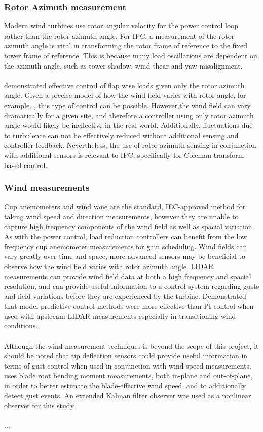 \subsubsection{Rotor Azimuth measurement}
Modern wind turbines use rotor angular velocity for the power control loop rather than the rotor azimuth angle. For IPC, a measurement of the rotor azimuth angle is vital in transforming the rotor frame of reference to the fixed tower frame of reference. This is because many load oscillations are dependent on the azimuth angle, such as tower shadow, wind shear and yaw misalignment. 
\\~\\
\citet{4_trudnowski} demonstrated effective control of flap wise loads given only the rotor azimuth angle. Given a precise model of how the wind field varies with rotor angle, for example, \citet{13_Dolan}, this type of control can be possible. However,the wind field can vary dramatically for a given site, and therefore a controller using only rotor azimuth angle would likely be ineffective in the real world. Additionally, fluctuations due to turbulence can not be effectively reduced without additional sensing and controller feedback. Nevertheless, the use of rotor azimuth sensing in conjunction with additional sensors is relevant to IPC, specifically for Coleman-transform based control.

\subsubsection{Wind measurements}
Cup anemometers and wind vane are the standard, IEC-approved method for taking wind speed and direction measurements, however they are unable to capture high frequency components of the wind field as well as spacial variation. As with the power control, load reduction controllers can benefit from the low frequency cup anemometer measurements for gain scheduling. Wind fields can vary greatly over time and space, more advanced sensors may be beneficial to observe how the wind field varies with rotor azimuth angle. LIDAR measurements can provide wind field data at both a high frequency and spacial resolution, and can provide useful information to a control system regarding gusts and field variations before they are experienced by the turbine. \citet{6_Mirzaei} Demonstrated that model predictive control methods were more effective than PI control when used with upstream LIDAR measurements especially in transitioning wind conditions. 
\\~\\
Although the wind measurement techniques is beyond the scope of this project, it should be noted that tip deflection sensors could provide useful information in terms of gust control when used in conjunction with wind speed measurements. \citet{2_Kanev} uses blade root bending moment measurements, both in-plane and out-of-plane, in order to better estimate the blade-effective wind speed, and to additionally detect gust events. An extended Kalman filter observer was used as a nonlinear observer for this study.
\\~\\
...
